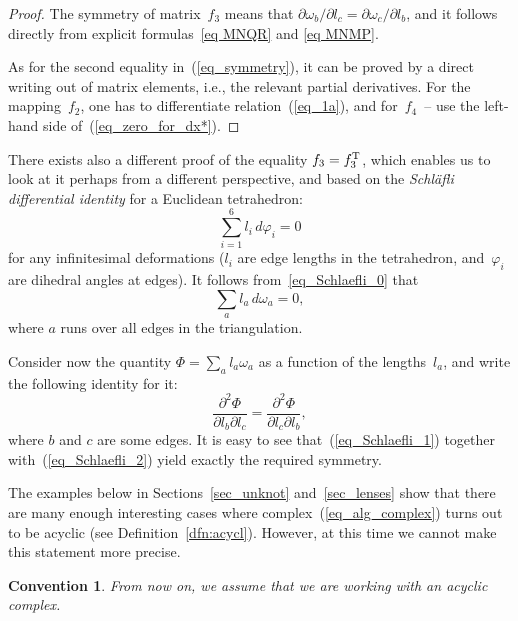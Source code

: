\documentclass[pdftex]{sigma}
\newtheorem{convention}{Convention}}
\begin{document}
\begin{proof} The symmetry of matrix~$f_3$ means that $\partial \omega_b / \partial l_c = \partial \omega_c / \partial l_b$, and it follows directly from explicit formulas~\eqref{eq MNQR} and \eqref{eq MNMP}.

As for the second equality in~(\ref{eq_symmetry}), it can be proved by a direct writing out of matrix elements, i.e., the relevant partial derivatives. For the mapping~$f_2$, one has to dif\/ferentiate relation~(\ref{eq_1a}), and for~$f_4$~-- use the left-hand side of~(\ref{eq_zero_for_dx*}).
\end{proof}

\begin{remark}
There exists also a dif\/ferent proof of the equality $f_3 = f_3^{\rm T}$, which enables us to look at it perhaps from a dif\/ferent perspective, and based on the \emph{Schl\"afli differential identity} for a Euclidean tetrahedron:
\begin{equation}
\sum_{i=1}^6 l_i \, d\varphi_i = 0
\label{eq_Schlaefli_0}
\end{equation}
for any inf\/initesimal deformations ($l_i$ are edge lengths in the tetrahedron, and~$\varphi_i$ are dihedral angles at edges). It follows from~\eqref{eq_Schlaefli_0} that
\begin{equation}
\sum_a l_a \, d\omega_a = 0,
\label{eq_Schlaefli_1}
\end{equation}
where $a$ runs over all edges in the triangulation.

Consider now the quantity $\Phi=\sum_a l_a \omega_a$ as a function of the lengths~$l_a$, and write the following identity for it:
\begin{equation}
\frac{\partial^2 \Phi}{\partial l_b \partial l_c} = \frac{\partial^2 \Phi}{\partial l_c \partial l_b},
\label{eq_Schlaefli_2}
\end{equation}
where $b$ and $c$ are some edges. It is easy to see that~(\ref{eq_Schlaefli_1}) together with~(\ref{eq_Schlaefli_2}) yield exactly the required symmetry.
\end{remark}

The examples below in Sections~\ref{sec_unknot} and~\ref{sec_lenses} show that there are many enough interesting cases where complex~(\ref{eq_alg_complex}) turns out to be acyclic (see Def\/inition~\ref{dfn:acycl}). However, at this time we cannot make this statement more precise.

\begin{convention}
\label{conv3}
From now on, we assume that we are working with an \emph{acyclic complex}.
\end{convention}
\end{document}
